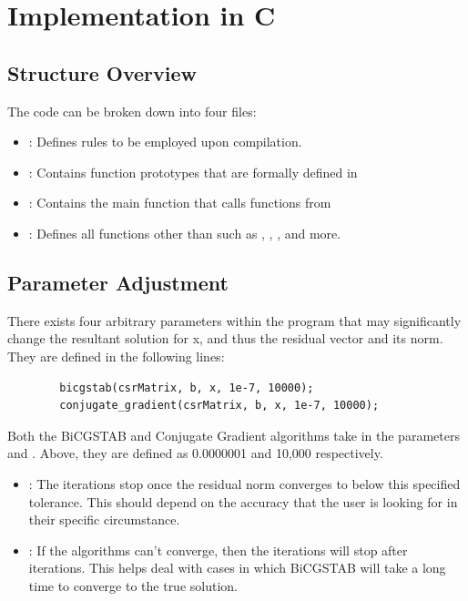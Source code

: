 \documentclass[12pt]{article}
\begin{document}
	\section{Implementation in C}

\subsection{Structure Overview}
 
	The code can be broken down into four files:
	
	\begin{itemize}
		\item {}: Defines rules to be employed upon compilation.
		\item {}: Contains function prototypes that are formally defined in 
		\item {}: Contains the main function that calls functions from 
		\item {}: Defines all functions other than  such as , , , and more.
	\end{itemize}

\subsection{Parameter Adjustment}
 
        There exists four arbitrary parameters within the program that may significantly change the resultant solution for x, and thus the residual vector and its norm. They are defined in the following lines:
	\begin{lstlisting}
		bicgstab(csrMatrix, b, x, 1e-7, 10000);
		conjugate_gradient(csrMatrix, b, x, 1e-7, 10000);
	\end{lstlisting}
Both the BiCGSTAB and Conjugate Gradient algorithms take in the parameters  and . Above, they are defined as 0.0000001 and 10,000 respectively.
 
 \begin{itemize}
     \item {}: The iterations stop once the residual norm converges to below this specified tolerance. This should depend on the accuracy that the user is looking for in their specific circumstance.
     \item {}: If the algorithms can't converge, then the iterations will stop after  iterations. This helps deal with cases in which BiCGSTAB will take a long time to converge to the true solution.
 \end{itemize}
	
\end{document}

